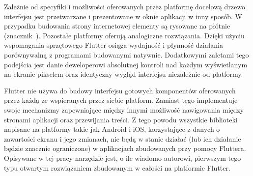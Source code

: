 Zależnie od specyfiki i możliwości oferowanych przez platformę docelową drzewo interfejsu jest przetwarzane i prezentowane w oknie aplikacji w inny sposób. W przypadku budowania strony internetowej elementy są rysowane na płótnie (znacznik~). Pozostałe platformy oferują analogiczne rozwiązania. Dzięki użyciu wspomagania sprzętowego Flutter osiąga wydajność i płynność działania porównywalną z programami budowanymi natywnie. Dodatkowymi zaletami tego podejścia jest danie deweloperowi absolutnej kontroli nad każdym wyświetlanym na ekranie pikselem oraz identyczny wygląd interfejsu niezależnie od platformy.

Flutter nie używa do budowy interfejsu gotowych komponentów oferowanych przez każdą ze wspieranych przez siebie platform. Zamiast tego implementuje swoje mechanizmy zapewniające między innymi możliwość nawigowania między stronami aplikacji oraz przewijania treści. Z tego powodu wszystkie biblioteki napisane na platformy takie jak Android i iOS, korzystające z danych o zawartości ekranu i jego zmianach, nie będą w stanie działać (lub ich działanie będzie znacznie ograniczone) w aplikacjach zbudowanych przy pomocy Fluttera. Opisywane w tej pracy narzędzie jest, o ile wiadomo autorowi, pierwszym tego typu otwartym rozwiązaniem zbudowanym w całości na platformie Flutter.


